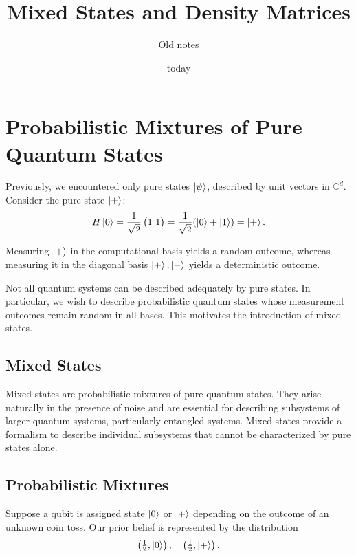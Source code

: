 \title{Mixed States and Density Matrices}
\author{Old notes}
\date{today}


\maketitle

\section{Probabilistic Mixtures of Pure Quantum States}

Previously, we encountered only pure states $\ket{\psi}$, described by unit vectors in $\mathbb{C}^d$. Consider the pure state $\ket{+}$:
\begin{equation}
H\ket{0} = \frac{1}{\sqrt{2}} \begin{pmatrix} 1 \ 1 \end{pmatrix} = \frac{1}{\sqrt{2}}(\ket{0}+\ket{1}) = \ket{+}.
\end{equation}

Measuring $\ket{+}$ in the computational basis yields a random outcome, whereas measuring it in the diagonal basis ${\ket{+},\ket{-}}$ yields a deterministic outcome.

Not all quantum systems can be described adequately by pure states. In particular, we wish to describe probabilistic quantum states whose measurement outcomes remain random in all bases. This motivates the introduction of mixed states.

\subsection{Mixed States}

Mixed states are probabilistic mixtures of pure quantum states. They arise naturally in the presence of noise and are essential for describing subsystems of larger quantum systems, particularly entangled systems. Mixed states provide a formalism to describe individual subsystems that cannot be characterized by pure states alone.

\subsection{Probabilistic Mixtures}

Suppose a qubit is assigned state $\ket{0}$ or $\ket{+}$ depending on the outcome of an unknown coin toss. Our prior belief is represented by the distribution
\begin{equation}
\left(\tfrac{1}{2}, \ket{0}\right), \quad \left(\tfrac{1}{2}, \ket{+}\right).
\end{equation}



